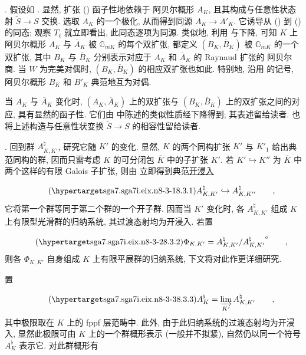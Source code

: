 \medskip
\noindent
{}. 假设如 . 显然, 扩张 () 函子性地依赖于 阿贝尔概形 $A_K$, 且其构成与任意性状态射 $\widetilde S\longrightarrow S$ 交换. 选取 $A_K$ 的一个极化, 从而得到同源 $A_K\longrightarrow A'_K$. 它诱导从 () 到 () 的同态; 观察 $T_\ell$ 就立即看出, 此同态逐项为同源. 类似地, 利用  与下降, 可知 $K$ 上 阿贝尔概形 $A_K$ 与 $\overline A_K$ 被 $\mathbb{G}_{mK}$ 的每个双扩张, 都定义 $(B_K,\overline B_K)$ 被 $\mathbb{G}_{mK}$ 的一个双扩张, 其中 $B_K$ 与 $\overline B_K$ 分别表示对应于 $A_K$ 和 $\overline A_K$ 的 Raynaud 扩张的 阿贝尔商. 当 $W$ 为完美对偶时, $(B_K,\overline B_K)$ 的相应双扩张也如此. 特别地, 沿用  的记号, 阿贝尔概形 $B_K$ 和 $B'_K$ 典范地互为对偶.

当 $A_K$ 与 $\overline A_K$ 变化时, $(A_K,\overline A_K)$ 上的双扩张与 $(B_K,\overline B_K)$ 上的双扩张之间的对应, 具有显然的函子性. 它们由  中陈述的类似性质经下降得到; 其表述留给读者. 也将上述构造与任意性状变换 $\widetilde S\longrightarrow S$ 的相容性留给读者.

\medskip
\noindent
{}. 回到群 $A_{K,K'}^{\natural}$, 研究它随 $K'$ 的变化. 显然, $K$ 的两个同构扩张 $K'$ 与 $K'_1$ 给出典范同构的群, 因而只需考虑 $K$ 的可分闭包 $\overline K$ 中的子扩张 $K'$. 若 $K'\hookrightarrow K''$ 为 $\overline K$ 中两个这样的有限 Galois 子扩张, 则由  立即得到典范\underline{开浸入}

\begin{equation}\tag{\SGARefTarget{sga7.sga7i.eix.n8-3-1}{8.3.1}}
A^{\natural}_{K,K'} \hookrightarrow A^{\natural}_{K,K''}
 \qquad ,
\end{equation}
它将第一个群等同于第二个群的一个开子群. 因而当 $K'$ 变化时, 各 $A^{\natural}_{K,K'}$ 组成 $K$ 上有限型光滑群的归纳系统, 其过渡态射均为开浸入. 若置

\begin{equation}\tag{\SGARefTarget{sga7.sga7i.eix.n8-3-2}{8.3.2}}
\Phi_{K,K'}=A^{\natural}_{K,K'}
 /{A^{\natural}_{K,K'}}^{o} \qquad ,
\end{equation}
则各 $\Phi_{K,K'}$ 自身组成 $K$ 上有限平展群的归纳系统, 下文将对此作更详细研究.

置

\begin{equation}\tag{\SGARefTarget{sga7.sga7i.eix.n8-3-3}{8.3.3}}
A^{\flat}_{K}=\varinjlim_{K'} A^{\natural}_{K,K'} \qquad ,
\end{equation}
其中极限取在 $K$ 上的 fppf 层范畴中. 此外, 由于此归纳系统的过渡态射均为开浸入, 显然此极限可由 $K$ 上的一个群概形表示 (一般并不拟紧), 自然仍以同一个符号 $A^{\flat}_{K}$ 表示它. 对此群概形有

